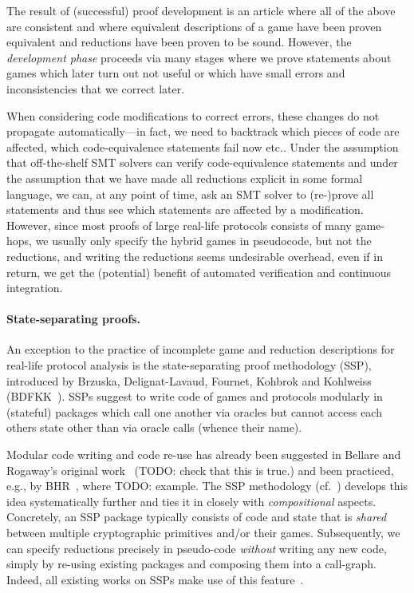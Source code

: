The result of (successful) proof development is an article where all of the
above are consistent and where equivalent descriptions of a game have
been proven equivalent and reductions have been proven to be sound.
However, the \emph{development phase} proceeds via many stages where
we prove statements about games which later turn out not useful or
which have small errors and inconsistencies that we correct later.

When considering code modifications to correct errors, these changes do not
propagate automatically---in fact, we need to backtrack which pieces
of code are affected, which code-equivalence statements fail now etc..
Under the assumption that off-the-shelf SMT solvers can verify
code-equivalence statements and under the assumption that we have
made all reductions explicit in some formal language, we can, at 
any point of time, ask an SMT solver to (re-)prove all statements and thus see which
statements are affected by a modification. However, since most proofs
of large real-life protocols consists of many game-hops, we usually only
specify the hybrid games in pseudocode, but not the reductions, and
writing the reductions seems undesirable overhead, even if in return, we
get the (potential) benefit of automated verification and continuous 
integration.

\paragraph{State-separating proofs.}
An exception to the practice of incomplete game and reduction descriptions for
real-life protocol analysis is the state-separating proof methodology (SSP),
introduced by Brzuska, Delignat-Lavaud, Fournet, Kohbrok and Kohlweiss (BDFKK~\cite{X}). SSPs suggest to write code of games and protocols modularly in (stateful) packages which call one another via oracles but cannot access each others state other than
via oracle calls (whence their name). 

Modular code writing and code re-use has already been suggested in Bellare and Rogaway's original work~\cite{X} (TODO: check that this is true.) and been practiced, e.g., by BHR~\cite{X}, where TODO: example.
The SSP methodology (cf.~\cite{X,Y,Z}) develops this idea systematically further and ties it in closely with \emph{compositional} aspects. Concretely, an SSP package typically consists of code and state that is \emph{shared} between multiple cryptographic primitives and/or their games. Subsequently, we can specify reductions precisely in pseudo-code \emph{without} writing any new code, simply by re-using existing packages and composing them into a call-graph. Indeed, all existing works on SSPs make use of this feature~\cite{blankedcite}.


